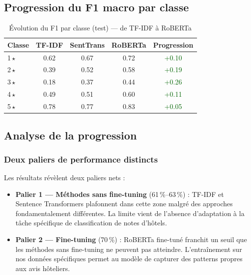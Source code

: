 \documentclass[12pt, a4paper]{article}
\begin{document}
\subsection{Progression du F1 macro par classe}

\begin{table}[H]
  \centering
  \begin{tabular}{lcccc}
    \toprule
    \textbf{Classe} & \textbf{TF-IDF} & \textbf{SentTrans} & \textbf{RoBERTa} & \textbf{Progression} \\
    \midrule
    1\,$\star$ & 0.62 & 0.67 & 0.72 & \textcolor{darkgreen}{+0.10} \\
    2\,$\star$ & 0.39 & 0.52 & 0.58 & \textcolor{darkgreen}{+0.19} \\
    3\,$\star$ & 0.18 & 0.37 & 0.44 & \textcolor{darkgreen}{+0.26} \\
    4\,$\star$ & 0.49 & 0.51 & 0.60 & \textcolor{darkgreen}{+0.11} \\
    5\,$\star$ & 0.78 & 0.77 & 0.83 & \textcolor{darkgreen}{+0.05} \\
    \bottomrule
  \end{tabular}
  \caption{Évolution du F1 par classe (test) — de TF-IDF à RoBERTa}
\end{table}

\subsection{Analyse de la progression}

\subsubsection{Deux paliers de performance distincts}

Les résultats révèlent deux paliers nets :

\begin{itemize}
  \item \textbf{Palier 1 — Méthodes sans fine-tuning} (61\,\%--63\,\%) :
        TF-IDF et Sentence Transformers plafonnent dans cette zone malgré des approches
        fondamentalement différentes. La limite vient de l'absence d'adaptation à la tâche
        spécifique de classification de notes d'hôtels.
  \item \textbf{Palier 2 — Fine-tuning} (70\,\%) :
        RoBERTa fine-tuné franchit un seuil que les méthodes sans fine-tuning ne peuvent
        pas atteindre. L'entraînement sur nos données spécifiques permet au modèle
        de capturer des patterns propres aux avis hôteliers.
\end{itemize}
\end{document}
